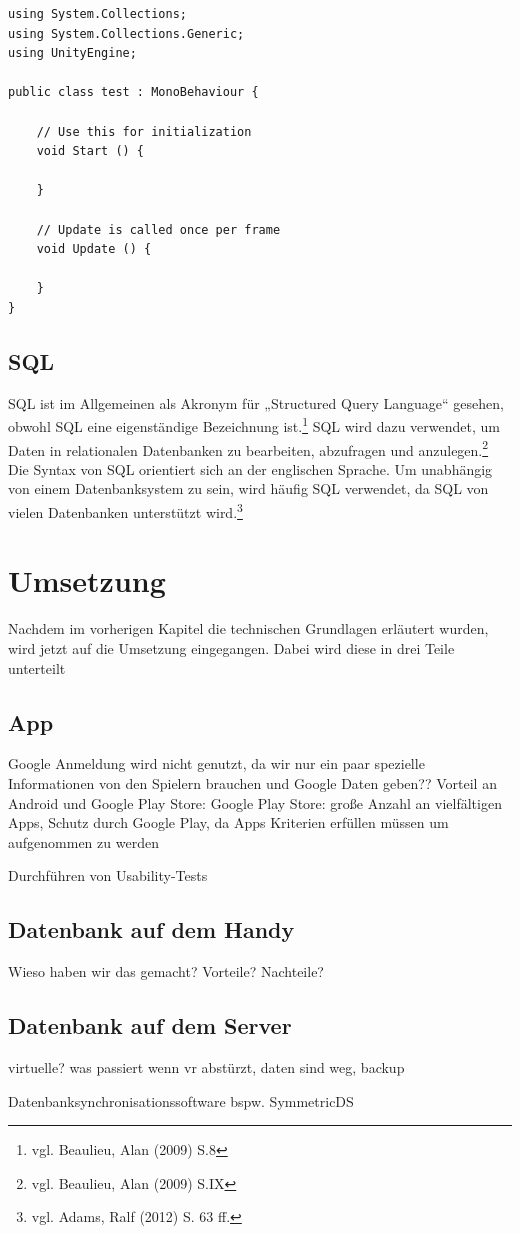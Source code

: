 \begin{scriptsize}
\lstset{
	float,
	caption=Aufbau eines Unity3D Skriptes, 
	language=[Sharp]C, 	
	frame=single,  
	showstringspaces=false, 
	showspaces=false, 
	numbers=left, 
	captionpos=b, 
	belowcaptionskip=4pt,
	basicstyle=\ttfamily
} 

\begin{lstlisting}[label=lst:unity3Dc]
using System.Collections;
using System.Collections.Generic;
using UnityEngine;

public class test : MonoBehaviour {

	// Use this for initialization
	void Start () {
		
	}
	
	// Update is called once per frame
	void Update () {
		
	}
}
\end{lstlisting}
\end{scriptsize}	

\section{SQL}

SQL ist im Allgemeinen als Akronym für „Structured Query Language“ gesehen, obwohl SQL eine eigenständige Bezeichnung ist.\footnote{vgl. Beaulieu, Alan\cite{sql1} (2009) S.8} SQL wird dazu verwendet, um Daten in relationalen Datenbanken zu bearbeiten, abzufragen und anzulegen.\footnote{vgl. Beaulieu, Alan\cite{sql1} (2009) S.IX} Die Syntax von SQL orientiert sich an der englischen Sprache. Um unabhängig von einem Datenbanksystem zu sein, wird häufig SQL verwendet, da SQL von vielen Datenbanken unterstützt wird.\footnote{vgl. Adams, Ralf\cite{sql2} (2012) S. 63 ff.}

\chapter{Umsetzung}

Nachdem im vorherigen Kapitel die technischen Grundlagen erläutert wurden, wird jetzt auf die Umsetzung eingegangen. Dabei wird diese in drei Teile unterteilt

\section{App}
Google Anmeldung wird nicht genutzt, da wir nur ein paar spezielle Informationen von den Spielern brauchen und Google Daten geben??
Vorteil an Android und Google Play Store: Google Play Store: große Anzahl an vielfältigen Apps, Schutz durch Google Play, da Apps Kriterien erfüllen müssen um aufgenommen zu werden

		Durchführen von Usability-Tests

\section{Datenbank auf dem Handy}
Wieso haben wir das gemacht? Vorteile? Nachteile?
	
\section{Datenbank auf dem Server}
virtuelle? was passiert wenn vr abstürzt, daten sind weg, backup

Datenbanksynchronisationssoftware bspw. SymmetricDS